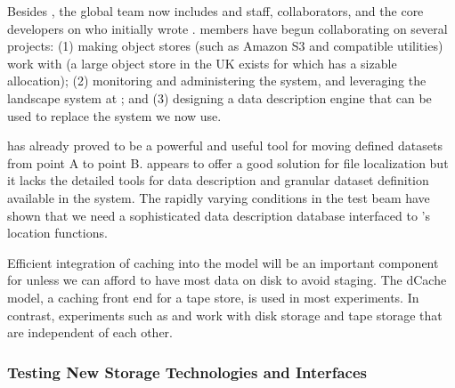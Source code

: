 Besides , the global  team now includes  and  staff,  collaborators, and the core developers on  who initially wrote .    members have begun collaborating on several projects:  (1) making object stores (such as Amazon S3 and compatible utilities) work with  (a large object store in the UK exists for which  has a sizable allocation);  (2) monitoring  and administering the  system, and leveraging the landscape system at ; and  (3) designing a  data description engine that can be used to replace the  system we now use.



 has already proved to be a powerful and useful tool for moving defined datasets from point A to point B.  %
 appears to offer a good solution for file localization but it lacks %
the detailed tools for data description and granular dataset definition available in the %
 system.  The rapidly varying conditions in the test beam have shown that we need a sophisticated data description database interfaced to 's location functions. 

Efficient integration of caching into the  model will be an important component for  unless we can afford to have most data on disk to avoid staging.  The dCache model, a caching front end for a tape store, is used in most  experiments. In contrast,  experiments such as  and  work with disk storage and tape storage that are independent of each other. 



\subsubsection{Testing New Storage Technologies and Interfaces}

